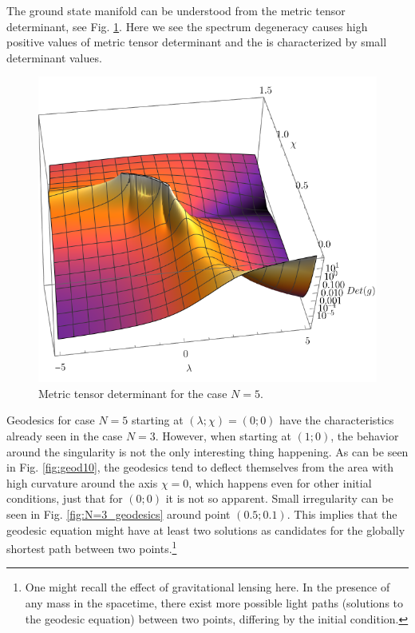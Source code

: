The ground state manifold can be understood from the metric tensor determinant, see Fig. \ref{fig:N=5_det3D}. Here we see the spectrum degeneracy causes high positive values of metric tensor determinant and the  is characterized by small determinant values. 
\begin{figure}[H]
    \centering
    \includegraphics[scale=1.3]{../img/N=5_det3D.pdf}
    \caption{Metric tensor determinant for the case $N=5$.}
    \label{fig:N=5_det3D}    
\end{figure}



Geodesics for case $N=5$ starting at $(\lambda;\chi)=(0;0)$ have the characteristics already seen in the case $N=3$. However, when starting at $(1;0)$, the behavior around the singularity is not the only interesting thing happening. As can be seen in Fig. \ref{fig:geod10}, the geodesics tend to deflect themselves from the area with high curvature around the axis $\chi=0$, which happens even for other initial conditions, just that for $(0;0)$ it is not so apparent. Small irregularity can be seen in Fig. \ref{fig:N=3_geodesics} around point $(0.5;0.1)$. This implies that the geodesic equation might have at least two solutions as candidates for the globally shortest path between two points.\footnote{One might recall the effect of gravitational lensing here. In the presence of any mass in the spacetime, there exist more possible light paths (solutions to the geodesic equation) between two points, differing by the initial condition.} 



